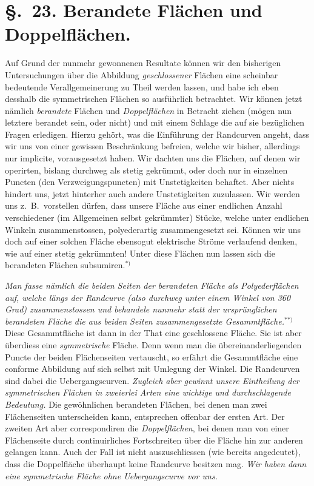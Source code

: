 \documentclass{article}
\begin{document}
\section*{§.~23. Berandete Flächen und Doppelflächen.}

Auf Grund der nunmehr gewonnenen Resultate können wir den bisherigen Untersuchungen über die Abbildung \emph{geschlossener} Flächen eine scheinbar bedeutende Verallgemeinerung zu Theil werden lassen, und habe ich eben desshalb die symmetrischen Flächen so ausführlich betrachtet. Wir können jetzt nämlich \emph{berandete} Flächen und \emph{Doppelflächen} in Betracht ziehen (mögen nun letztere berandet sein, oder nicht) und mit einem Schlage die auf sie bezüglichen Fragen erledigen. Hierzu gehört, was die Einführung der Randcurven angeht, dass wir uns von einer gewissen Beschränkung befreien, welche wir bisher, allerdings nur implicite, vorausgesetzt haben. Wir dachten uns die Flächen, auf denen wir operirten, bislang durchweg als stetig gekrümmt, oder doch nur in einzelnen Puncten (den Verzweigungspuncten) mit Unstetigkeiten behaftet. Aber nichts hindert uns, jetzt hinterher auch andere Unstetigkeiten zuzulassen. Wir werden uns z.\ B.\ vorstellen dürfen, dass unsere Fläche aus einer endlichen Anzahl verschiedener (im Allgemeinen selbst gekrümmter) Stücke, welche unter endlichen Winkeln zusammenstossen, polyederartig zusammengesetzt sei. Können wir uns doch auf einer solchen Fläche ebensogut elektrische Ströme verlaufend denken, wie auf einer stetig gekrümmten! Unter diese Flächen nun lassen sich die berandeten Flächen subsumiren.${}^{*)}$

\emph{Man fasse nämlich die beiden Seiten der berandeten Fläche als Polyederflächen auf, welche längs der Randcurve (also durchweg unter einem Winkel von 360 Grad) zusammenstossen und behandele nunmehr statt der ursprünglichen berandeten Fläche die aus beiden Seiten zusammengesetzte Gesammtfläche.}${}^{**)}$ Diese Gesammtfläche ist dann in der That eine geschlossene Fläche. Sie ist aber überdiess eine \emph{symmetrische} Fläche. Denn wenn man die übereinanderliegenden Puncte der beiden Flächenseiten vertauscht, so erfährt die Gesammtfläche eine conforme Abbildung auf sich selbst mit Umlegung der Winkel. Die Randcurven sind dabei die Uebergangscurven. \emph{Zugleich aber gewinnt unsere Eintheilung der symmetrischen Flächen in zweierlei Arten eine wichtige und durchschlagende Bedeutung.} Die gewöhnlichen berandeten Flächen, bei denen man zwei Flächenseiten unterscheiden kann, entsprechen offenbar der ersten Art. Der zweiten Art aber correspondiren die \emph{Doppelflächen}, bei denen man von einer Flächenseite durch continuirliches Fortschreiten über die Fläche hin zur anderen gelangen kann. Auch der Fall ist nicht auszuschliessen (wie bereits angedeutet), dass die Doppelfläche überhaupt keine Randcurve besitzen mag. \emph{Wir haben dann eine symmetrische Fläche ohne Uebergangscurve vor uns.}
\end{document}
